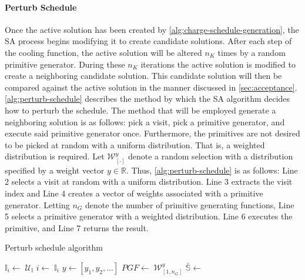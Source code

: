 \documentclass[11pt,a4paper,final]{article}
\newcommand{\I}{\mathbb{I}}                 %
\newcommand{\C}{\mathbb{C}}                 %
\newcommand{\U}{\mathcal{U}}                %
\newcommand{\W}{\mathcal{W}}                %
\newcommand{\Sol}{\mathbb{S}}               %
\begin{document}
\paragraph{Perturb Schedule}
\label{sec:tweak-schedule}
Once the active solution has been created by \ref{alg:charge-schedule-generation}, the SA process begins modifying it to
create candidate solutions. After each step of the cooling function, the active solution will be altered \(n_K\) times by
a random primitive generator. During these \(n_K\) iterations the active solution is modified to create a neighboring
candidate solution. This candidate solution will then be compared against the active solution in the manner discussed in
\ref{sec:acceptance}. \ref{alg:perturb-schedule} describes the method by which the SA algorithm decides how to perturb the
schedule. The method that will be employed generate a neighboring solution is as follows: pick a visit, pick a primitive
generator, and execute said primitive generator once. Furthermore, the primitives are not desired to be picked at random
with a uniform distribution. That is, a weighted distribution is required. Let \(\W^y_{[\cdot]}\) denote a random selection
with a distribution specified by a weight vector \(y \in \mathbb{R}\). Thus, \ref{alg:perturb-schedule} is as follows: Line 2 selects
a visit at random with a uniform distribution. Line 3 extracts the visit index and Line 4 creates a vector of weights
associated with a primitive generator. Letting \(n_G\) denote the number of primitive generating functions, Line 5 selects
a primitive generator with a weighted distribution. Line 6 executes the primitive, and Line 7 returns the result.

\begin{algorithm}[H]
\caption{Perturb schedule algorithm} \label{alg:perturb-schedule}

    \LinesNumbered
    \KwIn{$\Sol$}
    \KwOut{$\bar{\Sol}$}


    \Begin
    {
        $\I_i\leftarrow\; \U_{\I}$
        $i \leftarrow\; \I_i$
        $y \leftarrow [y_1, y_2, ...]$
        $PGF \leftarrow\; \W^y_{[1,n_G]}$
        $\bar{\Sol} \leftarrow$ \PGF{($i$, $\I$, $\C$)}
        \Return{($0, \bar{\I}$, $\bar{\C}$)}
    }
\end{algorithm}
\end{document}
